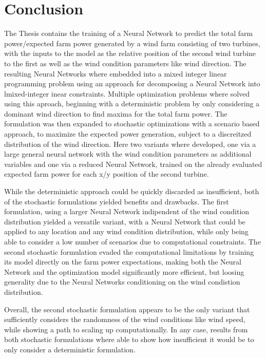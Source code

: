 
\chapter{Conclusion}\label{chapter:conclusion}

The Thesis contains the training of a Neural Network to predict the total farm power/expected farm power generated by a wind farm consisting of two turbines, with the inputs to the model as the relative position of the second wind turbine to the first as well as the wind condition parameters like wind direction. The resulting Neural Networks where embedded into a mixed integer linear programming problem using an approach for decomposing a Neural Network into lmixed-integer inear constraints. Multiple optimization problems where solved using this aproach, beginning with a deterministic problem by only considering a dominant wind direction to find maxima for the total farm power. The formulation was then expanded to stochastic optimizations with a scenario based approach, to maximize the expected power generation, subject to a discreitzed distribution of the wind direction. Here two variants where developed, one via a large general neural network with the wind condition parameters as additional variables and one via a reduced Neural Network, trained on the already evaluated expected farm power for each x/y position of the second turbine. 

While the deterministic approach could be quickly discarded as insufficient, both of the stochastic formulations yielded benefits and drawbacks. The first formulation, using a larger Neural Network indipendent of the wind condition distribution yielded a versatile variant, with a Neural Network that could be applied to any location and any wind condition distribution, while only being able to consider a low number of scenarios due to computational constraints. The second stochastic formulation evaded the computational limitations by training its model directly on the farm power expectations, making both the Neural Network and the optimization model significantly more efficient, but loosing generality due to the Neural Networks conditioning on the wind condistion distribution.

Overall, the second stochastic formulation appears to be the only variant that sufficiently considers the randomness of the wind conditions like wind speed, while showing a path to scaling up computationally. In any case, results from both stochastic formulations where able to show how insufficient it would be to only consider a deterministic formulation.

